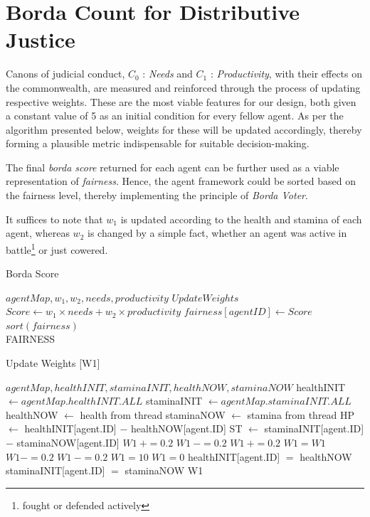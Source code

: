 \clearpage

\section{Borda Count for Distributive Justice }

Canons of judicial conduct, $C_0$ : \textit{Needs} and $C_1$ : \textit{Productivity}, with their effects on the commonwealth, are measured and reinforced through the process of updating respective weights. These are the most viable features for our design, both given a constant value of 5 as an initial condition for every fellow agent. As per the algorithm presented below, weights for these will be updated accordingly, thereby forming a plausible metric indispensable for suitable decision-making.

The final \textit{borda score} returned for each agent can be further used as a viable representation of \textit{fairness}. Hence, the agent framework could be sorted based on the fairness level, thereby implementing the principle of \textit{Borda Voter}.

It suffices to note that $w_1$ is updated according to the health and stamina of each agent, whereas $w_2$ is changed by a simple fact, whether an agent was active in battle\footnote{fought or defended actively} or just cowered.


\begin{algorithm}[htb]
\caption{Borda Score}\label{alg:5}
\begin{algorithmic} 
\scriptsize
\Require $agentMap, w_1, w_2, needs, productivity$
\State $Update Weights$
\State $Score \leftarrow w_1 \times needs + w_2 \times productivity$
\State $fairness[agentID] \leftarrow Score$
\EndWhile
\State $sort(fairness)$\\
\Return FAIRNESS
\end{algorithmic}
\end{algorithm}

\begin{algorithm}[htb]
\caption{Update Weights [W1]}\label{alg:6}
\begin{algorithmic} 
\scriptsize
\Require $agentMap, healthINIT, staminaINIT,healthNOW, staminaNOW$
\State healthINIT $\leftarrow agentMap.healthINIT.ALL$
\State staminaINIT $\leftarrow agentMap.staminaINIT.ALL$
\State healthNOW $\leftarrow$ health from thread
\State staminaNOW $\leftarrow$ stamina from thread
\State HP $\leftarrow$ healthINIT[agent.ID] $-$ healthNOW[agent.ID]
\State ST $\leftarrow$ staminaINIT[agent.ID] $-$ staminaNOW[agent.ID]
\State $W1~+= 0.2$
\Else
\State $W1~-= 0.2$
\EndIf
{}
\State $W1~+= 0.2$
\Else
{}
\State $W1 = W1$
\Else
\State $W1 -= 0.2$
\EndIf
\State $W1~-= 0.2$
\EndIf
{}
\State $W1=10$
\EndIf
{}
\State $W1 = 0$
\EndIf
\State healthINIT[agent.ID] $=$ healthNOW
\State staminaINIT[agent.ID] $=$ staminaNOW
\Return W1
\EndIf
\end{algorithmic}
\end{algorithm}


